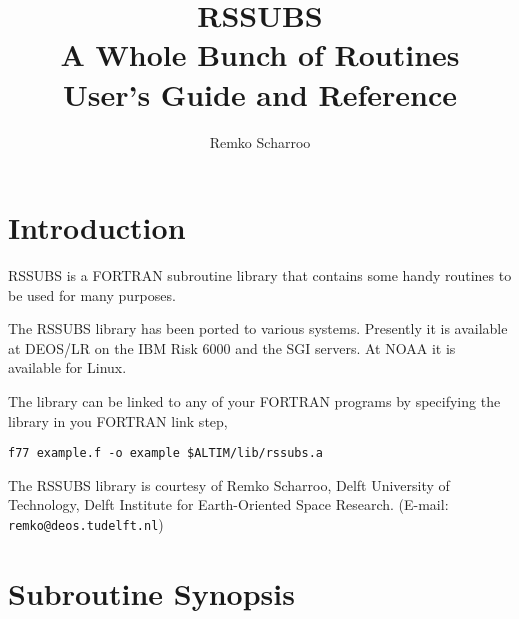 \documentclass[a4paper]{article}
\title{RSSUBS \\ A Whole Bunch of Routines \\
User's Guide and Reference}
\author{Remko Scharroo}
\def\Input#1{\vbox{}}
\begin{document}
\tableofcontents

\section{Introduction}
RSSUBS is a FORTRAN subroutine library that contains some handy routines to be
used for many purposes.

The RSSUBS library has been ported to various systems.
Presently it is available at DEOS/LR on the IBM Risk 6000 and the SGI
servers. At NOAA it is available for Linux.

The library can be linked to any of your
FORTRAN programs by specifying the library in you FORTRAN link step, \eg
\begin{verbatim}
f77 example.f -o example $ALTIM/lib/rssubs.a
\end{verbatim}

The RSSUBS library is courtesy of Remko Scharroo, Delft University of
Technology, Delft Institute for Earth-Oriented Space Research.
(E-mail: {\tt remko@deos.tudelft.nl})

\section{Subroutine Synopsis}
\Input{altbias}
\Input{anmtot}
\Input{anttom}
\Input{bubble}
\Input{carpol}
\Input{chartrans}
\Input{checkenv}
\Input{chrdat}
\Input{chrloc}


\Input{dhellips}
\Input{dqsort}
\Input{dyntopo}
\Input{earth}
\Input{elevec}
\Input{epharg}
\Input{ephpos}
\Input{f1f2}

\Input{fdate}
\Input{fin}
\Input{freeunit}
\Input{gauss1d}
\Input{geocen}
\Input{geodet}
\Input{geoutm}
\Input{geoxyz}

\Input{globpres}
\Input{grdate}
\Input{helmert1}
\Input{helmert2}
\Input{i2swap}
\Input{i4swap}
\Input{intab2}
\Input{intab8}
\Input{inter8}
\Input{iqsort}
\Input{isnan}

\Input{land}
\Input{listargs}
\Input{loadcoord}
\Input{lowercase}
\Input{ltlend}
\Input{mallocf}
\Input{matsy1}
\Input{memloc}
\Input{mcw}
\Input{mdate}
\Input{meteo_subs}
\Input{mjdate}

\Input{nff}
\Input{noise}
\Input{nuvel1a}
\Input{odrinfo}
\Input{polcar}
\Input{quaint}
\Input{regres}
\Input{rotate}
\Input{round}
\Input{scaprd}
\Input{sfdist}
\Input{sec85}
\Input{sland}
\Input{statbar}
\Input{statinfo}
\Input{statis}


\Input{uppercase}
\Input{vecele}
\Input{vecnrm}
\Input{vecprd}
\Input{vnorm}
\Input{xyzgeo}
\Input{ymdhms}
\end{document}
